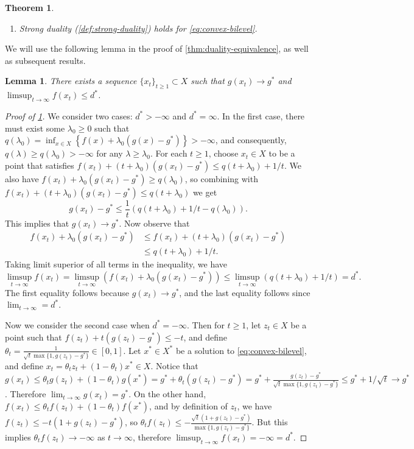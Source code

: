 \documentclass[11pt,oneside]{article}
\theoremstyle{plain}
\newtheorem{theorem}{Theorem}
\newtheorem{lemma}{Lemma}
\theoremstyle{plain}
\theoremstyle{plain}%
\begin{document}
{\begin{theorem}
\begin{enumerate}
    \item Strong duality (\cref{def:strong-duality}) holds for \cref{eq:convex-bilevel}.
\end{enumerate}
\end{theorem}
We will use the following lemma in the proof of \cref{thm:duality-equivalence}, as well as subsequent results.
\begin{lemma}\label{lemma:dual-value-sequence}
There exists a sequence $\{x_t\}_{t \geq 1} \subset X$ such that $g(x_t) \to g^*$ and $\limsup_{t \to \infty} f(x_t) \leq d^*$.
\end{lemma}
\begin{proof}[Proof of \cref{lemma:dual-value-sequence}]
We consider two cases: $d^* > -\infty$ and $d^* = \infty$. In the first case, there must exist some $\lambda_0 \geq 0$ such that $q(\lambda_0) = \inf_{x \in X} \left\{ f(x) + \lambda_0 (g(x) - g^*) \right\} > -\infty$, and consequently, $q(\lambda) \geq q(\lambda_0) > -\infty$ for any $\lambda \geq \lambda_0$. For each $t \geq 1$, choose $x_t \in X$ to be a point that satisfies $f(x_t) + (t+\lambda_0) (g(x_t) - g^*) \leq q(t+\lambda_0) + 1/t$. We also have $f(x_t) + \lambda_0 (g(x_t) - g^*) \geq q(\lambda_0)$, so combining with $f(x_t) + (t+\lambda_0) (g(x_t) - g^*) \leq q(t+\lambda_0)$ we get
\[ g(x_t) - g^* \leq \frac{1}{t} \left( q(t+\lambda_0) + 1/t - q(\lambda_0) \right). \]
This implies that $g(x_t) \to g^*$. Now observe that
\begin{align*}
f(x_t) + \lambda_0 (g(x_t) - g^*) &\leq f(x_t) + (t+\lambda_0) (g(x_t) - g^*)\\
&\leq q(t+\lambda_0) + 1/t.
\end{align*}
Taking limit superior of all terms in the inequality, we have
\[ \limsup_{t \to \infty} f(x_t) = \limsup_{t \to \infty} \left( f(x_t) + \lambda_0 (g(x_t) - g^*) \right) \leq \limsup_{t \to \infty} \left( q(t+\lambda_0) + 1/t \right) = d^*. \]
The first equality follows because $g(x_t) \to g^*$, and the last equality follows since $\lim_{t \to \infty} = d^*$.

Now we consider the second case when $d^* = -\infty$. Then for $t \geq 1$, let $z_t \in X$ be a point such that $f(z_t) + t(g(z_t) - g^*) \leq -t$, and define $\theta_t = \frac{1}{\sqrt{t} \max\{1, g(z_t) - g^*\}} \in [0,1]$. Let $x^* \in X^*$ be a solution to \cref{eq:convex-bilevel}, and define $x_t = \theta_t z_t + (1-\theta_t) x^* \in X$. Notice that
$g(x_t) \leq \theta_t g(z_t) + (1-\theta_t) g(x^*) = g^* + \theta_t (g(z_t) - g^*) = g^* + \frac{g(z_t) - g^*}{\sqrt{t} \max\{1,g(z_t)-g^*\}} \leq g^* + 1/\sqrt{t} \to g^*$. Therefore $\lim_{t \to \infty} g(x_t) = g^*$. On the other hand, $f(x_t) \leq \theta_t f(z_t) + (1-\theta_t) f(x^*)$, and by definition of $z_t$, we have $f(z_t) \leq -t(1 + g(z_t) - g^*)$, so $\theta_t f(z_t) \leq -\frac{\sqrt{t} (1+g(z_t) - g^*)}{\max\{1,g(z_t)-g^*\}}$. But this implies $\theta_t f(z_t) \to -\infty$ as $t \to \infty$, therefore $\limsup_{t \to \infty} f(x_t) = -\infty = d^*$.
\end{proof}

}
\end{document}
